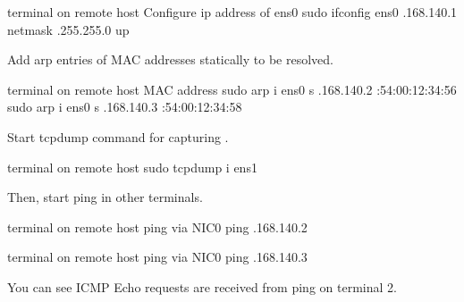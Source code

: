 \documentclass[a4paper,11pt,openany,oneside,english]{sphinxmanual}
\begin{document}
\begin{sphinxVerbatim}[commandchars=\\\{\},formatcom=\footnotesize]
 terminal  on remote host
 Configure ip address of ens0
 sudo ifconfig ens0 .168.140.1 netmask .255.255.0 up
\end{sphinxVerbatim}

Add arp entries of MAC addresses statically to be resolved.

\begin{sphinxVerbatim}[commandchars=\\\{\},formatcom=\footnotesize]
 terminal  on remote host
  MAC address
 sudo arp \PYGZhy{}i ens0 \PYGZhy{}s .168.140.2 :54:00:12:34:56
 sudo arp \PYGZhy{}i ens0 \PYGZhy{}s .168.140.3 :54:00:12:34:58
\end{sphinxVerbatim}

Start tcpdump command for capturing .

\begin{sphinxVerbatim}[commandchars=\\\{\},formatcom=\footnotesize]
 terminal  on remote host
 sudo tcpdump \PYGZhy{}i ens1
\end{sphinxVerbatim}

Then, start ping in other terminals.

\begin{sphinxVerbatim}[commandchars=\\\{\},formatcom=\footnotesize]
 terminal  on remote host
 ping via NIC0
 ping .168.140.2
\end{sphinxVerbatim}

\begin{sphinxVerbatim}[commandchars=\\\{\},formatcom=\footnotesize]
 terminal  on remote host
 ping via NIC0
 ping .168.140.3
\end{sphinxVerbatim}

You can see ICMP Echo requests are received from ping on terminal 2.
\end{document}
